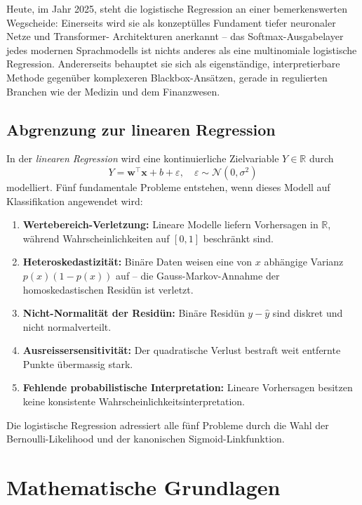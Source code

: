 ﻿\documentclass[12pt, a4paper]{article}
\theoremstyle{definition}
\theoremstyle{remark}
\newcommand{\R}{\mathbb{R}}
\newcommand{\vw}{\bm{w}}
\newcommand{\vx}{\bm{x}}
\newcommand{\T}{\top}
\begin{document}
Heute, im Jahr 2025, steht die logistische Regression an einer bemerkenswerten Wegscheide:
Einerseits wird sie als konzeptülles Fundament tiefer neuronaler Netze und Transformer-
Architekturen anerkannt -- das Softmax-Ausgabelayer jedes modernen Sprachmodells ist nichts
anderes als eine multinomiale logistische Regression. Andererseits behauptet sie sich als
eigenständige, interpretierbare Methode gegenüber komplexeren Blackbox-Ansätzen, gerade
in regulierten Branchen wie der Medizin und dem Finanzwesen.

\subsection{Abgrenzung zur linearen Regression}

In der \emph{linearen Regression} wird eine kontinuierliche Zielvariable $Y \in \R$ durch
\[
  Y = \vw^\T \vx + b + \varepsilon, \quad \varepsilon \sim \mathcal{N}(0, \sigma^2)
\]
modelliert. Fünf fundamentale Probleme entstehen, wenn dieses Modell auf Klassifikation angewendet wird:

\begin{enumerate}[label=(\roman*)]
  \item \textbf{Wertebereich-Verletzung:} Lineare Modelle liefern Vorhersagen in $\R$, während Wahrscheinlichkeiten auf $[0,1]$ beschränkt sind.
  \item \textbf{Heteroskedastizität:} Binäre Daten weisen eine von $x$ abhängige Varianz $p(x)(1-p(x))$ auf -- die Gauss-Markov-Annahme der homoskedastischen Residün ist verletzt.
  \item \textbf{Nicht-Normalität der Residün:} Binäre Residün $y - \hat{y}$ sind diskret und nicht normalverteilt.
  \item \textbf{Ausreissersensitivität:} Der quadratische Verlust bestraft weit entfernte Punkte übermassig stark.
  \item \textbf{Fehlende probabilistische Interpretation:} Lineare Vorhersagen besitzen keine konsistente Wahrscheinlichkeitsinterpretation.
\end{enumerate}

Die logistische Regression adressiert alle fünf Probleme durch die Wahl der Bernoulli-Likelihood und der kanonischen Sigmoid-Linkfunktion.

\section{Mathematische Grundlagen}
\end{document}
